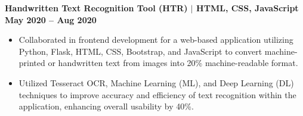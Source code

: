 \documentclass{article}
\begin{document}
\textbf{\textbf{Handwritten Text Recognition Tool (HTR) }  $\mid$ \textbf{HTML, CSS, JavaScript} } \hfill \textbf{\textbf{May 2020 – Aug 2020} }
\begin{itemize}[noitemsep,nolistsep,leftmargin=*]
    \item Collaborated in frontend development for a web-based application utilizing Python, Flask, HTML, CSS, Bootstrap, and JavaScript to convert machine-printed or handwritten text from images into 20\% machine-readable format.
    \item Utilized Tesseract OCR, Machine Learning (ML), and Deep Learning (DL) techniques to improve accuracy and efficiency of text recognition within the application, enhancing overall usability by 40\%.
\end{itemize}







\end{document}

